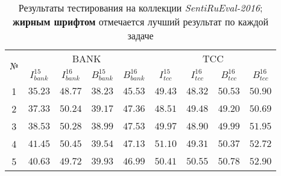 \begin{table}[ht!]
\centering
\caption{Результаты тестирования на коллекции {\it SentiRuEval-2016};
        {\bf жирным шрифтом} отмечается лучший результат по каждой задаче
        }
\label{table:results2016}
\begin{tabular}{ccccccccc}
\hline
\multicolumn{1}{c|}{\multirow{2}{*}{№}} & \multicolumn{4}{c|}{BANK}                                                                                                                                 & \multicolumn{4}{c}{TCC}                                                                                                          \\ \cline{2-9}
\multicolumn{1}{c|}{}                   & \multicolumn{1}{c|}{$I_{bank}^{15}$} & \multicolumn{1}{c|}{$I_{bank}^{16}$}   & \multicolumn{1}{c|}{$B_{bank}^{15}$} & \multicolumn{1}{c|}{$B_{bank}^{16}$} & \multicolumn{1}{c|}{$I_{tcc}^{15}$} & \multicolumn{1}{c|}{$I_{tcc}^{16}$} & \multicolumn{1}{c|}{$B_{tcc}^{16}$} & $B_{tcc}^{16}$ \\ \hline
1                                       & $35.23$                              & ${48.77}$                              & $38.23$                              & $45.53$                              & $49.43$                             & $48.32$                             & $50.53$                 & $50.90$                    \\
2                                       & $37.33$                              & ${50.24}$                              & $39.17$                              & $47.36$                              & $48.51$                             & $49.48$                             & $49.20$                 & $50.69$                    \\
3                                       & $38.53$                              & ${50.28}$                              & $38.99$                              & $47.53$                              & $49.97$                             & $48.90$                             & $49.99$                 & $51.95$                    \\
4                                       & $41.45$                              & ${50.45}$                              & $39.54$                              & $47.13$                              & $51.10$                             & $49.31$                             & $50.37$                 & $52.72$                    \\
5                                       & $40.63$                              & ${49.72}$                              & $39.93$                              & $46.99$                              & $50.41$                             & $50.55$                             & $50.78$                 & $52.90$                    \\

\end{tabular}
\end{table}
